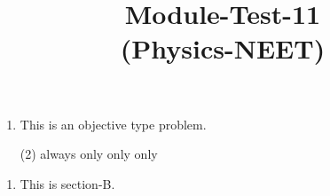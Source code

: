 \documentclass{article}
\title{Module-Test-11\\(Physics-NEET)}
\begin{document}
\maketitle

\neetSectionA
\begin{enumerate}
\item This is an objective type problem.
    \begin{tasks}(2)
        \task always\ans
        \task only 
        \task only 
        \task only 
    \end{tasks}
\end{enumerate}

\neetSectionB
\begin{enumerate}\addtocounter{enumi}{35}
\item This is section-B.
    \begin{tasks}{2}
        \task \ans
        \task   
        \task
        \task
    \end{tasks}
\end{enumerate}
\end{document}
